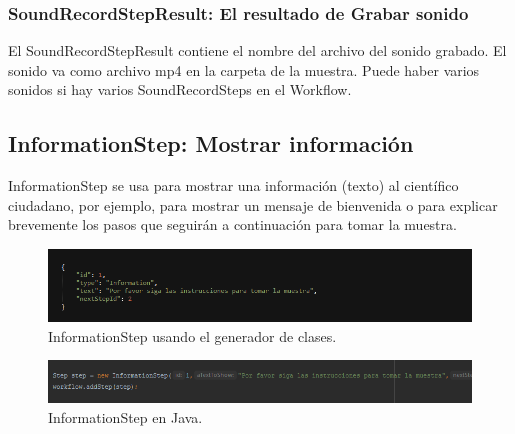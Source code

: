 \subsubsection{SoundRecordStepResult: El resultado de Grabar sonido}
El SoundRecordStepResult contiene el nombre del archivo del sonido grabado. El sonido va como archivo mp4 en la carpeta de la muestra.
Puede haber varios sonidos si hay varios SoundRecordSteps en el Workflow.



\subsection{InformationStep: Mostrar información}
InformationStep se usa para mostrar una información (texto) al científico ciudadano, por ejemplo, para mostrar un mensaje de bienvenida o para explicar brevemente los pasos que seguirán a continuación para tomar la muestra.


\begin{figure}[H]
  \centering
    \includegraphics[scale=0.6]{50-anexos/C-steps/information_json.png} 
    \caption{InformationStep usando el generador de clases.}
\end{figure}	

\begin{figure}[H]
  \centering
    \includegraphics[scale=0.6]{50-anexos/C-steps/information_java.png} 
    \caption{InformationStep en Java.}
\end{figure}


